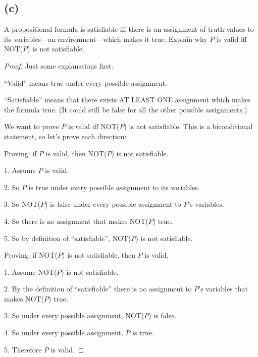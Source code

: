 \documentclass[14pt]{extarticle}
\begin{document}
\subsection{(c)}
A propositional formula is satisfiable iff there is an assignment of truth values to its variables—an environment—which makes it true. Explain why $P$ is valid iff NOT($P$) is not satisfiable.
\begin{proof}
Just some explanations first. 

``Valid'' means true under every possible assignment. 

``Satisfiable'' means that there exists AT LEAST ONE assignment which makes the formula true. (It could still be false for all the other possible assignments.)

We want to prove $P$ is valid iff NOT($P$) is not satisfiable. This is a biconditional statement, so let's prove each direction:

Proving: if $P$ is valid, then NOT($P$) is not satisfiable.

1. Assume $P$ is valid.

2. So $P$ is true under every possible assignment to its variables.

3. So NOT($P$) is false under every possible assignment to $P$'s variables.

4. So there is no assignment that makes NOT($P$) true.

5. So by definition of ``satisfiable'', NOT($P$) is not satisfiable.

Proving: if NOT($P$) is not satisfiable, then $P$ is valid.

1. Assume NOT($P$) is not satisfiable.

2. By the definition of ``satisfiable'' there is no assignment to $P$'s variables that makes NOT($P$) true.

3. So under every possible assignment, NOT($P$) is false.

4. So under every possible assignment, $P$ is true.

5. Therefore $P$ is valid.
\end{proof}
\end{document}
